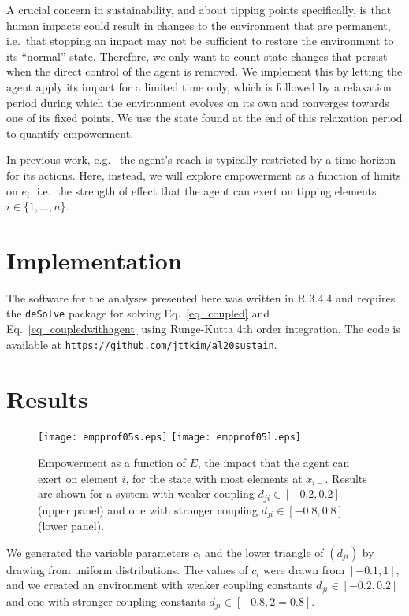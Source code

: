 \documentclass[letterpaper]{article}
\newcommand{\agentimpact}{\ensuremath{e}}
\begin{document}
A crucial concern in sustainability, and about tipping points
specifically, is that human impacts could result in changes to the
environment that are permanent, i.e.\ that stopping an impact may not
be sufficient to restore the environment to its ``normal'' state.
Therefore, we only want to count state changes that persist when the
direct control of the agent is removed. We implement this by letting
the agent apply its impact for a limited time only, which is followed
by a relaxation period during which the environment evolves on its own
and converges towards one of its fixed points. We use the state found
at the end of this relaxation period to quantify empowerment.


In previous work, e.g.\ \cite{Salge2014_empowermentintro}
the agent's reach is typically restricted by a time horizon for its actions. Here, instead, we will explore empowerment as a function of limits on
$\agentimpact_i$, i.e.\ the strength of  effect that the
agent can exert on tipping elements $i \in \{1, \ldots, n\}$.


\section{Implementation}

The software for the analyses presented here was written in R 3.4.4
\citep{RManual2018} and requires the \texttt{deSolve} package for
solving Eq.~\ref{eq_coupled} and
Eq.~\ref{eq_coupledwithagent} using Runge-Kutta 4th order integration.
The code is available at
\texttt{https://github.com/jttkim/al20sustain}.


\section{Results}

\begin{figure}
  \begin{center}
    \texttt{[image: empprof05s.eps]}
    \texttt{[image: empprof05l.eps]}
    \caption{Empowerment as a function of $E$, the impact that the
      agent can exert on element $i$, for the state with most elements
      at $x_{i-}$. Results are shown for a system with weaker coupling
      $d_{ji} \in [-0.2, 0.2]$ (upper panel) and one with stronger
      coupling $d_{ji} \in [-0.8, 0.8]$ (lower panel).}
    \label{fig_empowermentprofiles}
  \end{center}
\end{figure}
We generated the variable parameters $c_i$ and the lower triangle of
$(d_{ji})$ by drawing from uniform distributions. The values of $c_i$
were drawn from $[-0.1, 1]$, and we created an environment with weaker
coupling constants $d_{ji} \in [-0.2, 0.2]$ and one with stronger
coupling constants $d_{ji} \in [-0.8, 2=0.8]$.
\end{document}
